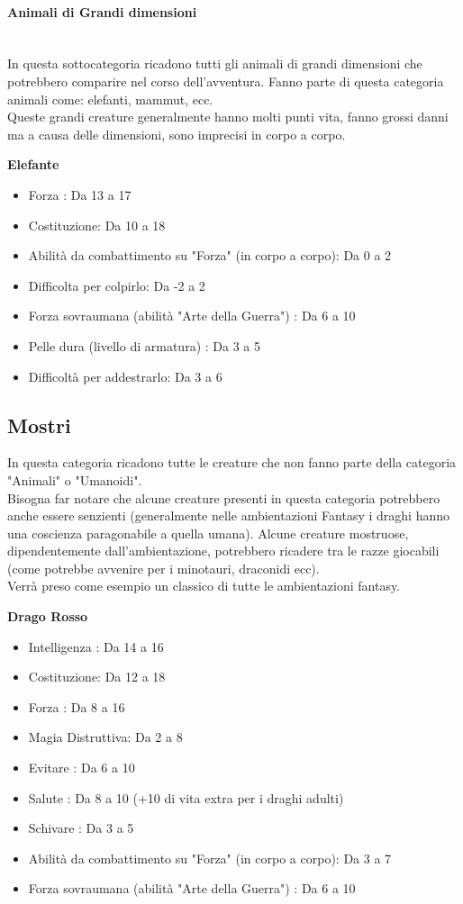 \documentclass[../manuale_main.tex]{subfiles}
\begin{document}
\paragraph{Animali di Grandi dimensioni}\mbox{}\\
In questa sottocategoria ricadono tutti gli animali di grandi dimensioni che potrebbero comparire nel corso dell'avventura. Fanno parte di questa categoria animali come: elefanti, mammut, ecc.\\
Queste grandi creature generalmente hanno molti punti vita, fanno grossi danni ma a causa delle dimensioni, sono imprecisi in corpo a corpo.

\textbf{Elefante}
\begin{itemize}
\item Forza : Da 13 a 17
\item Costituzione: Da 10 a 18
\item Abilità da combattimento su "Forza" (in corpo a corpo): Da 0 a 2
\item Difficolta per colpirlo: Da -2 a 2
\item Forza sovraumana (abilità "Arte della Guerra") : Da 6 a 10
\item Pelle dura (livello di armatura) : Da 3 a 5
\item Difficoltà per addestrarlo: Da 3 a 6
\end{itemize}




\subsection{Mostri}
In questa categoria ricadono tutte le creature che non fanno parte della categoria "Animali" o "Umanoidi".\\
Bisogna far notare che alcune creature presenti in questa categoria potrebbero anche essere senzienti (generalmente nelle ambientazioni Fantasy i draghi hanno una coscienza paragonabile a quella umana). Alcune creature mostruose, dipendentemente dall'ambientazione, potrebbero ricadere tra le razze giocabili (come potrebbe avvenire per i minotauri, draconidi ecc).\\
Verrà preso come esempio un classico di tutte le ambientazioni fantasy.

\textbf{Drago Rosso}
\begin{itemize}
\item Intelligenza : Da 14 a 16
\item Costituzione: Da 12 a 18
\item Forza : Da 8 a 16
\item Magia Distruttiva: Da 2 a 8
\item Evitare : Da 6 a 10
\item Salute : Da 8 a 10 (+10 di vita extra per i draghi adulti)
\item Schivare : Da 3 a 5
\item Abilità da combattimento su "Forza" (in corpo a corpo): Da 3 a 7
\item Forza sovraumana (abilità "Arte della Guerra") : Da 6 a  10
\end{itemize}
\end{document}
